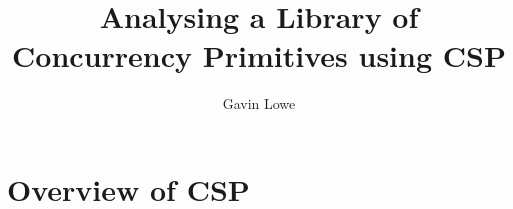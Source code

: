 \documentclass[12pt,a4paper]{article}
\title{Analysing a Library of Concurrency Primitives using CSP}
\author{Gavin Lowe}
\begin{document}
\maketitle



\section{Overview of CSP} 
\label{sec:csp}
\framebox{\ldots}














\appendix



\end{document}

